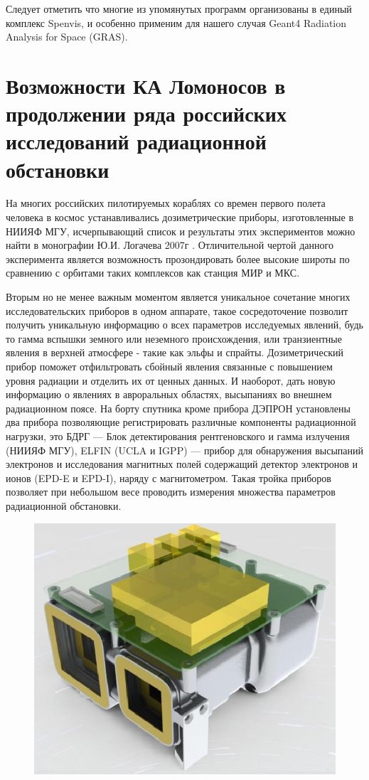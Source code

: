 Следует отметить что многие из упомянутых программ организованы в единый комплекс Spenvis,
 и особенно применим для нашего случая  Geant4 Radiation Analysis for Space (GRAS).

\section{Возможности КА Ломоносов в продолжении ряда российских исследований радиационной обстановки}

На многих российских пилотируемых кораблях со времен первого полета человека в космос устанавливались дозиметрические приборы, изготовленные в НИИЯФ МГУ, исчерпывающий список и результаты этих экспериментов можно найти в монографии Ю.И. Логачева 2007г \cite{logachev2007}. Отличительной чертой данного эксперимента является возможность прозондировать более высокие широты по сравнению с орбитами таких комплексов как станция МИР и МКС. 

Вторым но не менее важным моментом является уникальное сочетание многих исследовательских приборов в одном аппарате, такое сосредоточение позволит получить уникальную информацию о всех параметров исследуемых явлений, будь то гамма вспышки земного или неземного происхождения, или транзиентные явления в верхней атмосфере - такие как эльфы и спрайты. Дозиметрический прибор поможет отфильтровать сбойный явления связанные с повышением уровня радиации и отделить их от ценных данных. И наоборот, дать новую информацию о явлениях в авроральных областях, высыпаниях во внешнем радиационном поясе.
На борту спутника кроме прибора ДЭПРОН установлены два прибора позволяющие регистрировать различные компоненты радиационной нагрузки, это БДРГ --- Блок детектирования рентгеновского и гамма излучения (НИИЯФ МГУ), ELFIN (UCLA и IGPP) --- прибор для обнаружения высыпаний электронов и исследования магнитных полей содержащий детектор электронов и ионов (EPD-E и EPD-I), наряду с магнитометром. Такая тройка приборов позволяет при небольшом весе проводить измерения множества  параметров радиационной обстановки.



\begin{figure}

\includegraphics[width=0.7\linewidth]{images/EPD_Brochure}
\caption{}
\label{fig:epdbrochure}
\end{figure}

